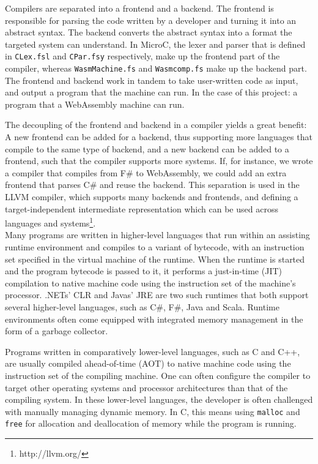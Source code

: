 \documentclass[a4paper]{article}
\begin{document}
Compilers are separated into a frontend and a backend. The frontend is responsible for parsing the code written by a developer and turning it into an abstract syntax. The backend converts the abstract syntax into a format the targeted system can understand. In MicroC, the lexer and parser that is defined in \texttt{CLex.fsl} and \texttt{CPar.fsy} respectively, make up the frontend part of the compiler, whereas \texttt{WasmMachine.fs} and \texttt{Wasmcomp.fs} make up the backend part. The frontend and backend work in tandem to take user-written code as input, and output a program that the machine can run. In the case of this project: a program that a WebAssembly machine can run.

The decoupling of the frontend and backend in a compiler yields a great benefit: A new frontend can be added for a backend, thus supporting more languages that compile to the same type of backend, and a new backend can be added to a frontend, such that the compiler supports more systems. If, for instance, we wrote a compiler that compiles from F\# to WebAssembly, we could add an extra frontend that parses C\# and reuse the backend. This separation is used in the LLVM compiler, which supports many backends and frontends, and defining a target-independent intermediate representation which can be used across languages and systems\footnote{http://llvm.org/}.\\

Many programs are written in higher-level languages that run within an assisting runtime environment and compiles to a variant of bytecode, with an instruction set specified in the virtual machine of the runtime. When the runtime is started and the program bytecode is passed to it, it performs a just-in-time (JIT) compilation to native machine code using the instruction set of the machine's processor. .NETs' CLR and Javas' JRE are two such runtimes that both support several higher-level languages, such as C\#, F\#, Java and Scala. Runtime environments often come equipped with integrated memory management in the form of a garbage collector.

Programs written in comparatively lower-level languages, such as C and C++, are usually compiled ahead-of-time (AOT) to native machine code using the instruction set of the compiling machine. One can often configure the compiler to target other operating systems and processor architectures than that of the compiling system. In these lower-level languages, the developer is often challenged with manually managing dynamic memory. In C, this means using \texttt{malloc} and \texttt{free} for allocation and deallocation of memory while the program is running.
\end{document}
